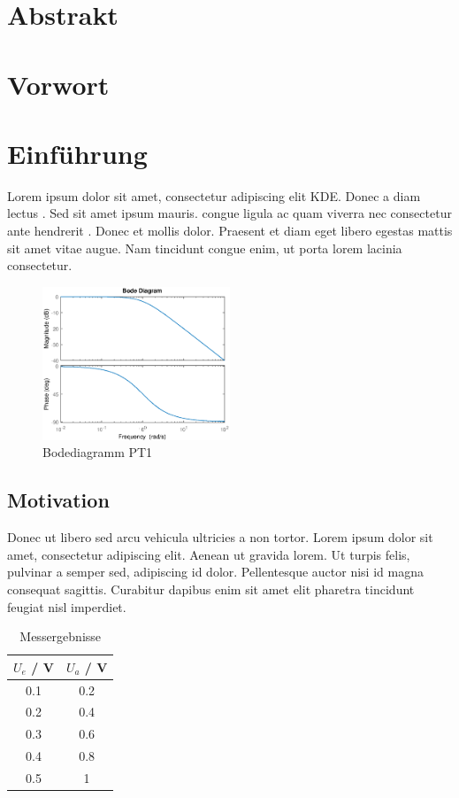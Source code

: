 \documentclass[a4paper,12pt]{article}
\begin{document}
\section*{Abstrakt}
\newpage
\section*{Vorwort}
\newpage
{}
\tableofcontents
\newpage
\section{Einführung}
Lorem ipsum dolor sit amet, consectetur adipiscing elit \ac{KDE}. Donec a diam lectus \cite{Accardi.2010}. Sed sit amet ipsum mauris.  congue ligula ac quam viverra nec consectetur ante hendrerit \cite{Lewis.2010}. Donec et mollis dolor. Praesent et diam eget libero egestas mattis sit amet vitae augue. Nam tincidunt congue enim, ut porta lorem lacinia consectetur. 

\begin{figure}[h]
\center \includegraphics[width=0.5\textwidth]{Bilder/PT1/PT1.eps}
\caption{Bodediagramm PT1}
\end{figure}

\subsection{Motivation}
Donec ut libero sed arcu vehicula ultricies a non tortor. Lorem ipsum dolor sit amet, consectetur adipiscing elit. Aenean ut gravida lorem. Ut turpis felis, pulvinar a semper sed, adipiscing id dolor. Pellentesque auctor nisi id magna consequat sagittis. Curabitur dapibus enim sit amet elit pharetra tincidunt feugiat nisl imperdiet.

\begin{table}[h]
	\center
	\begin{tabular}[h]{|c|c|}
		\hline
		$U_e$ / V& $U_a$ / V\\ \hline
		0.1 & 0.2 \\ \hline
		0.2 & 0.4 \\ \hline
		0.3 & 0.6 \\ \hline
		0.4 & 0.8 \\ \hline
		0.5 & 1 \\ \hline
	\end{tabular}
	\caption{Messergebnisse}
\end{table}
\end{document}
